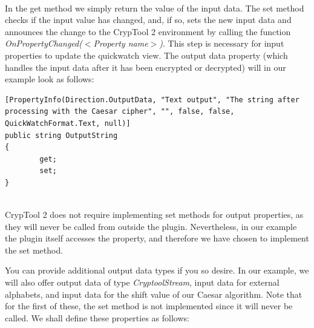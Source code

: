 \ \\
In the get method we simply return the value of the input data. The set method checks if the input value has changed, and, if so, sets the new input data and announces the change to the CrypTool 2 environment by calling the function \textit{OnPropertyChanged(\textit{$<$Property name$>$})}. This step is necessary for input properties to update the quickwatch view. The output data property (which handles the input data after it has been encrypted or decrypted) will in our example look as follows:


\begin{lstlisting}
[PropertyInfo(Direction.OutputData, "Text output", "The string after processing with the Caesar cipher", "", false, false, QuickWatchFormat.Text, null)]
public string OutputString
{
		get;
		set;
}
\end{lstlisting}

\ \\
\indent CrypTool 2 does not require implementing set methods for output properties, as they will never be called from outside the plugin. Nevertheless, in our example the plugin itself accesses the property, and therefore we have chosen to implement the set method.

You can provide additional output data types if you so desire. In our example, we will also offer output data of type \textit{CryptoolStream}, input data for external alphabets, and input data for the shift value of our Caesar algorithm. Note that for the first of these, the set method is not implemented since it will never be called. We shall define these properties as follows:

